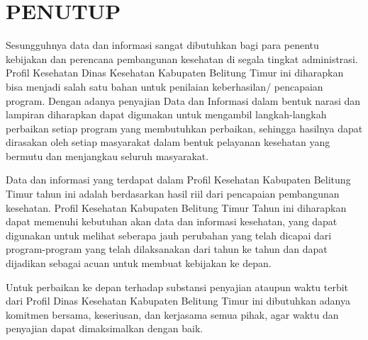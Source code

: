 \chapter{PENUTUP}
Sesungguhnya data dan informasi sangat dibutuhkan bagi para penentu
kebijakan dan perencana pembangunan kesehatan di segala tingkat administrasi.
Profil Kesehatan Dinas Kesehatan Kabupaten Belitung Timur \tP ini
diharapkan bisa menjadi salah satu bahan untuk penilaian keberhasilan/
pencapaian program. Dengan adanya penyajian Data dan Informasi dalam
bentuk narasi dan lampiran diharapkan dapat digunakan untuk mengambil
langkah-langkah perbaikan setiap program yang membutuhkan perbaikan,
sehingga hasilnya dapat dirasakan oleh setiap masyarakat dalam bentuk
pelayanan kesehatan yang bermutu dan menjangkau seluruh masyarakat.

Data dan informasi yang terdapat dalam Profil Kesehatan Kabupaten
Belitung Timur tahun \tP ini adalah berdasarkan hasil riil dari pencapaian
pembangunan kesehatan. Profil Kesehatan Kabupaten Belitung Timur Tahun
\tP ini diharapkan dapat memenuhi kebutuhan akan data dan informasi
kesehatan, yang dapat digunakan untuk melihat seberapa jauh perubahan
yang telah dicapai dari program-program yang telah dilaksanakan dari
tahun ke tahun dan dapat dijadikan sebagai acuan untuk membuat kebijakan
ke depan.

Untuk perbaikan ke depan terhadap substansi penyajian ataupun waktu
terbit dari Profil Dinas Kesehatan Kabupaten Belitung Timur ini dibutuhkan
adanya komitmen bersama, keseriusan, dan kerjasama semua pihak, agar
waktu dan penyajian dapat dimaksimalkan dengan baik. 